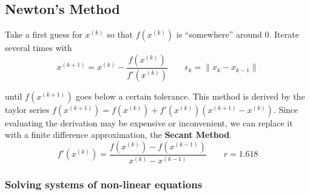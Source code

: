 \documentclass[8pt,a4paper]{scrartcl}
\begin{document}
\begin{multicols*}{3}
\subsection{Newton's Method}

Take a first guess for $x^{(k)}$ so that $f(x^{(k)})$ is ``somewhere'' around 0. Iterate several times with 
\begin{equation*}
x^{(k+1)} = x^{(k)} - \frac{f(x^{(k)})}{f'(x^{(k)})}\qquad \epsilon_k=\|x_k-x_{k-1}\|
\end{equation*}


until $f(x^{(k+1)})$ goes below a certain tolerance. This method is derived by the taylor series $f(x^{(k+1)}) = f(x^{(k)}) + f'(x^{(k)}) (x^{(k+1)}-x^{(k)})$. Since evaluating the derivation may be expensive or inconvenient, we can replace it with a finite difference approximation, the \textbf{Secant Method}.
\begin{equation*}
f'(x^{(k)}) = \frac{ f(x^{(k)}) - f(x^{(k-1)})}{x^{(k)} - x^{(k-1)}}\qquad r=1.618
\end{equation*}

\subsubsection{Solving systems of non-linear equations}


\end{multicols*}
\end{document}
